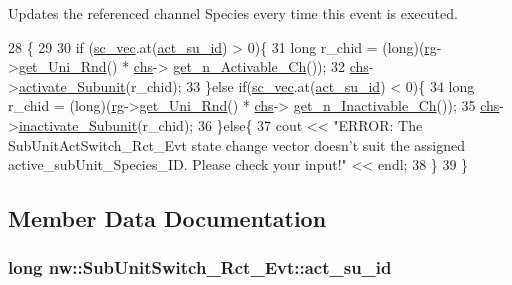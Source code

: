 Updates the referenced channel Species every time this event is executed. 


\begin{DoxyCode}
28                                               \{
29 
30     \textcolor{keywordflow}{if} (\hyperlink{classnw_1_1___event_a560c8b6f9954a43f5d5f80204473b64d}{sc\_vec}.at(\hyperlink{classnw_1_1_sub_unit_switch___rct___evt_a3f14cca01fc1645696666330a7354865}{act\_su\_id}) > 0)\{
31         \textcolor{keywordtype}{long} r\_chid = (long)(\hyperlink{classnw_1_1___event_af92482aeea55562560573ecccd5ab108}{rg}->\hyperlink{classnw_1_1_uni___rnd_ad7883ef0ce4c591612bcb41678104773}{get\_Uni\_Rnd}() * \hyperlink{classnw_1_1_sub_unit_switch___rct___evt_a260fabe9e3e1d8b79c3c80bb987716a5}{chs}->
      \hyperlink{classnw_1_1_channel___spc_aecd939824b8d2a275cbe360f60ae4a2d}{get\_n\_Activable\_Ch}());
32         \hyperlink{classnw_1_1_sub_unit_switch___rct___evt_a260fabe9e3e1d8b79c3c80bb987716a5}{chs}->\hyperlink{classnw_1_1_channel___spc_ab5176b0d9aed2ac68a142488d11b5e81}{activate\_Subunit}(r\_chid);
33     \}\textcolor{keywordflow}{else} \textcolor{keywordflow}{if}(\hyperlink{classnw_1_1___event_a560c8b6f9954a43f5d5f80204473b64d}{sc\_vec}.at(\hyperlink{classnw_1_1_sub_unit_switch___rct___evt_a3f14cca01fc1645696666330a7354865}{act\_su\_id}) < 0)\{
34         \textcolor{keywordtype}{long} r\_chid = (long)(\hyperlink{classnw_1_1___event_af92482aeea55562560573ecccd5ab108}{rg}->\hyperlink{classnw_1_1_uni___rnd_ad7883ef0ce4c591612bcb41678104773}{get\_Uni\_Rnd}() * \hyperlink{classnw_1_1_sub_unit_switch___rct___evt_a260fabe9e3e1d8b79c3c80bb987716a5}{chs}->
      \hyperlink{classnw_1_1_channel___spc_a99c02ea4a145d6531ed2328de073fb37}{get\_n\_Inactivable\_Ch}());
35         \hyperlink{classnw_1_1_sub_unit_switch___rct___evt_a260fabe9e3e1d8b79c3c80bb987716a5}{chs}->\hyperlink{classnw_1_1_channel___spc_a190172435ab84f9210ae027d06aae81a}{inactivate\_Subunit}(r\_chid);
36     \}\textcolor{keywordflow}{else}\{
37         cout << \textcolor{stringliteral}{"ERROR: The SubUnitActSwitch\_Rct\_Evt state change vector doesn't suit the assigned
       active\_subUnit\_Species\_ID. Please check your input!"} << endl;
38     \}
39 \}
\end{DoxyCode}


\subsection{Member Data Documentation}
\hypertarget{classnw_1_1_sub_unit_switch___rct___evt_a3f14cca01fc1645696666330a7354865}{
\subsubsection[{act\+\_\+su\+\_\+id}]{\setlength{\rightskip}{0pt plus 5cm}long nw\+::\+Sub\+Unit\+Switch\+\_\+\+Rct\+\_\+\+Evt\+::act\+\_\+su\+\_\+id\hspace{0.3cm}{\ttfamily [private]}}}\label{classnw_1_1_sub_unit_switch___rct___evt_a3f14cca01fc1645696666330a7354865}


